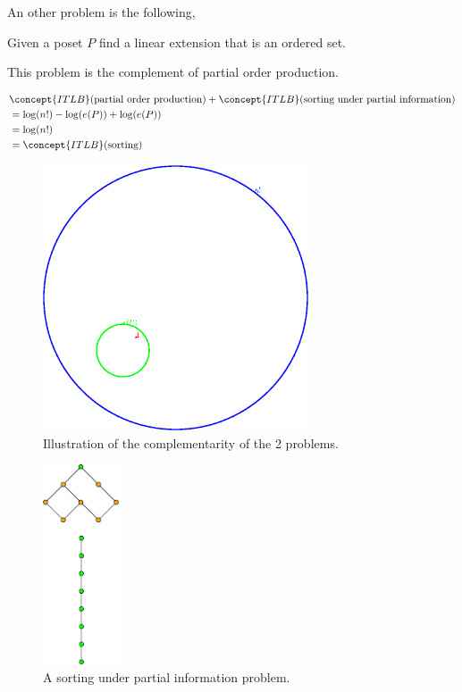 
An other problem is the following,

Given a poset $P$ find a linear extension that is an ordered set.

This problem is the complement of partial order production.

\begin{align*}
& \concept{ITLB}(\text{partial order production}) + \concept{ITLB}(\text{sorting under partial information}) \\
&= \log(n!) - \log(e(P)) + \log(e(P)) \\
&= \log(n!) \\
&= \concept{ITLB}(\text{sorting})
\label{eq:complementarity}
\end{align*}

\begin{figure}
	\centering
	\includegraphics[width=0.7\textwidth]{fig/entropy:set}
	\caption{\label{fig:entropy:set} Illustration of the complementarity of the 2 problems.}
\end{figure}

\begin{figure}
	\centering
	\includegraphics[width=0.2\textwidth]{fig/sorting-under-partial-information:diag}
	\caption{\label{fig:sorting-under-partial-information:diag} A sorting under partial information problem.}
\end{figure}

